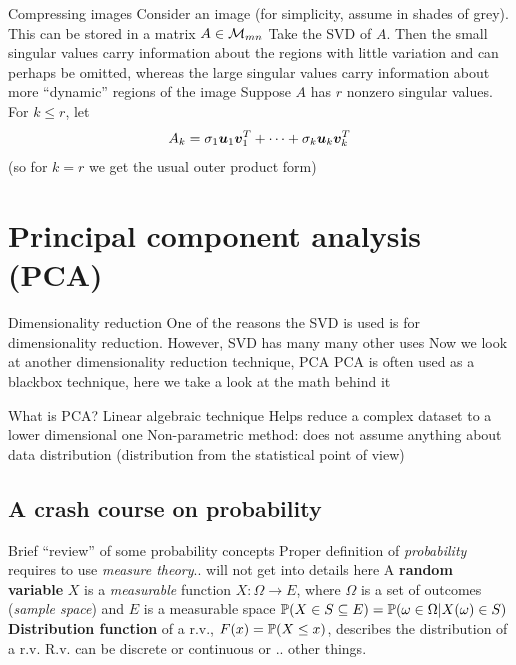 \documentclass[aspectratio=169]{beamer}\usepackage[]{graphicx}\usepackage[]{xcolor}
\begin{document}
\begin{frame}{Compressing images}
Consider an image (for simplicity, assume in shades of grey). This can be stored in a matrix $A\in\mathcal{M}_{mn}$
\vfill
Take the SVD of $A$. Then the small singular values carry information about the regions with little variation and can perhaps be omitted, whereas the large singular values carry information about more ``dynamic'' regions of the image
\vfill
Suppose $A$  has $r$ nonzero singular values. For $k\leq r$, let
\[
A_k = \sigma_1\bm{u}_1\bm{v}_1^T+\cdots+\sigma_k\bm{u}_k\bm{v}_k^T
\]
(so for $k=r$ we get the usual outer product form)
\end{frame}


\section{Principal component analysis (PCA)}


\begin{frame}{Dimensionality reduction}
One of the reasons the SVD is used is for dimensionality reduction. However, SVD has many many other uses
\vfill
Now we look at another dimensionality reduction technique, PCA
\vfill
PCA is often used as a blackbox technique, here we take a look at the math behind it
\end{frame}


\begin{frame}{What is PCA?}
Linear algebraic technique 
\vfill
Helps reduce a complex dataset to a lower dimensional one
\vfill
Non-parametric method: does not assume anything about data distribution (distribution from the statistical point of view)
\end{frame}

\subsection{A crash course on probability}


\begin{frame}{Brief ``review'' of some probability concepts}
Proper definition of \emph{probability} requires to use \emph{measure theory}.. will not get into details here
\vfill
A \textbf{random variable} $X$ is a \emph{measurable} function $X:\Omega\to E$, where $\Omega$ is a set of outcomes (\emph{sample space}) and $E$ is a measurable space
\vfill
$\mathbb{P}(X\in S\subseteq E) = \mathbb{P}(\omega\in\Omega|X(\omega)\in S)$
\vfill
\textbf{Distribution function} of a r.v., $F(x)=\mathbb{P}(X\leq x)$, describes the distribution of a r.v.
\vfill
R.v. can be discrete or continuous or .. other things. 
\end{frame}
\end{document}
